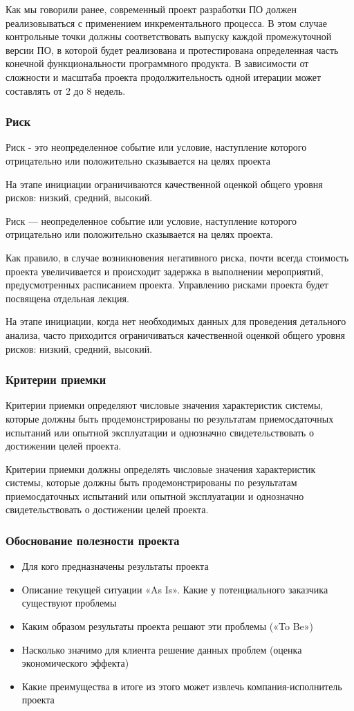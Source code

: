 \documentclass{../industrial-development}
\begin{document}
Как мы говорили ранее, современный проект разработки ПО должен реализовываться с применением инкрементального процесса. В этом случае контрольные точки должны соответствовать выпуску каждой промежуточной версии ПО, в которой будет реализована и протестирована определенная часть конечной функциональности программного продукта. В зависимости от сложности и масштаба проекта продолжительность одной итерации может составлять от 2 до 8 недель.

    \begin{frame} \frametitle{Риск}
	\begin{definition}
		Риск - это неопределенное событие или условие, наступление которого отрицательно или положительно сказывается на целях проекта
	\end{definition}
	На этапе инициации ограничиваются качественной оценкой общего уровня рисков: низкий, средний, высокий.
    \end{frame}
    \lecturenotes

Риск — неопределенное событие или условие, наступление которого отрицательно или положительно сказывается на целях проекта.

Как правило, в случае возникновения негативного риска, почти всегда стоимость проекта увеличивается и происходит задержка в выполнении мероприятий, предусмотренных расписанием проекта. Управлению рисками проекта будет посвящена отдельная лекция.

На этапе инициации, когда нет необходимых данных для проведения детального анализа, часто приходится ограничиваться качественной оценкой общего уровня рисков: низкий, средний, высокий.

    \begin{frame} \frametitle{Критерии приемки}
	Критерии приемки определяют числовые значения характеристик системы, которые должны быть продемонстрированы по результатам приемосдаточных испытаний или опытной эксплуатации и однозначно свидетельствовать о достижении целей проекта.
    \end{frame}
    \lecturenotes

Критерии приемки должны определять числовые значения характеристик системы, которые должны быть продемонстрированы по результатам приемосдаточных испытаний или опытной эксплуатации и однозначно свидетельствовать о достижении целей проекта.

    \begin{frame} \frametitle{Обоснование полезности проекта}
	\begin{itemize}
		\item Для кого предназначены результаты проекта
		\item Описание текущей ситуации «As Is». Какие у потенциального заказчика существуют проблемы
		\item Каким образом результаты проекта решают эти проблемы («To Be»)
		\item Насколько значимо для клиента решение данных проблем (оценка экономического эффекта)
		\item Какие преимущества в итоге из этого может извлечь компания-исполнитель проекта
	\end{itemize}
    \end{frame}
    \lecturenotes
\end{document}
